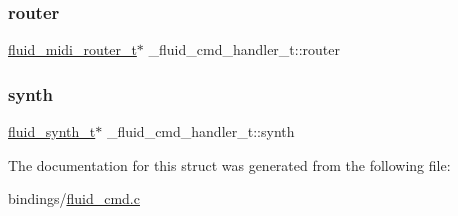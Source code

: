 \mbox{\label{struct__fluid__cmd__handler__t_ab9df6a4bfe87019036cb7af62b661b3e}} 
\subsubsection{\texorpdfstring{router}{router}}
{\footnotesize\ttfamily \hyperlink{types_8h_aa57b4746220e24506a169f109875e4ad}{fluid\+\_\+midi\+\_\+router\+\_\+t}$\ast$ \+\_\+fluid\+\_\+cmd\+\_\+handler\+\_\+t\+::router}

\mbox{\label{struct__fluid__cmd__handler__t_a8a9b69dc646976e07a15fe815bcf811f}} 
\subsubsection{\texorpdfstring{synth}{synth}}
{\footnotesize\ttfamily \hyperlink{types_8h_ae265f10ae174a13afe010de50d87e1a4}{fluid\+\_\+synth\+\_\+t}$\ast$ \+\_\+fluid\+\_\+cmd\+\_\+handler\+\_\+t\+::synth}



The documentation for this struct was generated from the following file\+:\begin{DoxyCompactItemize}
\item 
bindings/\hyperlink{fluid__cmd_8c}{fluid\+\_\+cmd.\+c}\end{DoxyCompactItemize}
